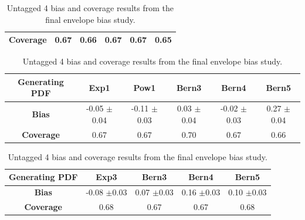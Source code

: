 \begin{table}
\begin{subtable}{\textwidth}
\begin{tabular}{|c|ccccc|}
            \textbf{Coverage} & 0.67 & 0.66 & 0.67 & 0.67 & 0.65\\ \hline
        \end{tabular}
        \caption{Untagged 2 bias and coverage results from the final envelope bias study.}
        \label{tab:bias_cat2_m105-170}
    \end{subtable}
    \vspace*{0.25 cm}
    \begin{subtable}{\textwidth}
        \footnotesize
        \centering
        \begin{tabular}{|c|ccccc|} \hline
            \textbf{Generating PDF} &Exp1 &Pow1 &Bern3&Bern4&Bern5\\ \hline
            \textbf{Bias} &\tabincell{c}{-0.05\\$\pm$0.04}&\tabincell{c}{-0.11\\$\pm$0.03}&\tabincell{c}{0.03\\$\pm$0.04}&\tabincell{c}{-0.02\\$\pm$0.03}&\tabincell{c}{0.27\\$\pm$0.04}\\ 
            \textbf{Coverage} & 0.67&0.67 & 0.70 &0.67 & 0.66\\ \hline
        \end{tabular}
        \caption{Untagged 3 bias and coverage results from the final envelope bias study.}
        \label{tab:bias_cat3_m105-170}
    \end{subtable}
    \vspace*{0.25 cm}
    \begin{subtable}{\textwidth}
        \footnotesize
        \centering
        \begin{tabular}{|c|cccc|} \hline
            \textbf{Generating PDF} &Exp3 &Bern3 &Bern4 &Bern5\\ \hline
            \textbf{Bias} &\tabincell{c}{-0.08\\$\pm$0.03} &\tabincell{c}{0.07\\$\pm$0.03} &\tabincell{c}{0.16\\$\pm$0.03} &\tabincell{c}{0.10\\$\pm$0.03}\\ 
            \textbf{Coverage} & 0.68 & 0.67 & 0.67 & 0.68\\ \hline
        \end{tabular}
        \caption{Untagged 4 bias and coverage results from the final envelope bias study.}
        \label{tab:bias_cat4_m105-170}
    \end{subtable}

\end{table}
